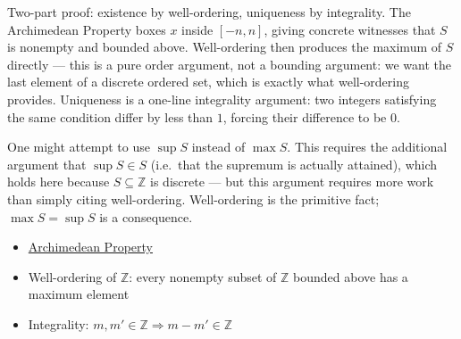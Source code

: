 \begin{remark*}
Two-part proof: existence by well-ordering, uniqueness by integrality.
The Archimedean Property boxes $x$ inside $[-n, n]$, giving concrete
witnesses that $S$ is nonempty and bounded above.
Well-ordering then produces the maximum of $S$ directly ---
this is a pure order argument, not a bounding argument:
we want the last element of a discrete ordered set, which is
exactly what well-ordering provides.
Uniqueness is a one-line integrality argument:
two integers satisfying the same condition differ by less than $1$,
forcing their difference to be $0$.

\end{remark*}

\begin{remark*}
One might attempt to use $\sup S$ instead of $\max S$.
This requires the additional argument that $\sup S \in S$
(i.e.\ that the supremum is actually attained), which holds here
because $S \subseteq \mathbb{Z}$ is discrete ---
but this argument requires more work than simply citing well-ordering.
Well-ordering is the primitive fact; $\max S = \sup S$ is a consequence.
\end{remark*}

\begin{dependencies}
\begin{itemize}
  \item \hyperref[prf:archimedean-property]{Archimedean Property}
  \item Well-ordering of $\mathbb{Z}$: every nonempty subset of $\mathbb{Z}$
        bounded above has a maximum element
  \item Integrality: $m, m' \in \mathbb{Z} \Rightarrow m - m' \in \mathbb{Z}$
\end{itemize}
\end{dependencies}
